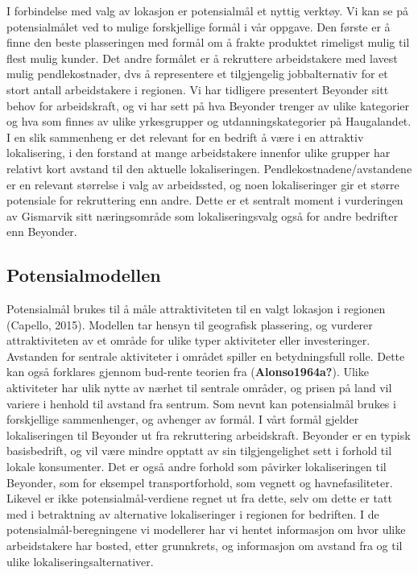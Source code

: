 \documentclass[
]{article}
\begin{document}
I forbindelse med valg av lokasjon er potensialmål et nyttig verktøy. Vi
kan se på potensialmålet ved to mulige forskjellige formål i vår
oppgave. Den første er å finne den beste plasseringen med formål om å
frakte produktet rimeligst mulig til flest mulig kunder. Det andre
formålet er å rekruttere arbeidstakere med lavest mulig pendlekostnader,
dvs å representere et tilgjengelig jobbalternativ for et stort antall
arbeidstakere i regionen. Vi har tidligere presentert Beyonder sitt
behov for arbeidskraft, og vi har sett på hva Beyonder trenger av ulike
kategorier og hva som finnes av ulike yrkesgrupper og
utdanningskategorier på Haugalandet. I en slik sammenheng er det
relevant for en bedrift å være i en attraktiv lokalisering, i den
forstand at mange arbeidstakere innenfor ulike grupper har relativt kort
avstand til den aktuelle lokaliseringen. Pendlekostnadene/avstandene er
en relevant størrelse i valg av arbeidssted, og noen lokaliseringer gir
et større potensiale for rekruttering enn andre. Dette er et sentralt
moment i vurderingen av Gismarvik sitt næringsområde som
lokaliseringsvalg også for andre bedrifter enn Beyonder.

\hypertarget{potensialmodellen}{%
\subsection{Potensialmodellen}\label{potensialmodellen}}

Potensialmål brukes til å måle attraktiviteten til en valgt lokasjon i
regionen (Capello, 2015). Modellen tar hensyn til geografisk plassering,
og vurderer attraktiviteten av et område for ulike typer aktiviteter
eller investeringer. Avstanden for sentrale aktiviteter i området
spiller en betydningsfull rolle. Dette kan også forklares gjennom
bud-rente teorien fra (\textbf{Alonso1964a?}). Ulike aktiviteter har
ulik nytte av nærhet til sentrale områder, og prisen på land vil variere
i henhold til avstand fra sentrum. Som nevnt kan potensialmål brukes i
forskjellige sammenhenger, og avhenger av formål. I vårt formål gjelder
lokaliseringen til Beyonder ut fra rekruttering arbeidskraft. Beyonder
er en typisk basisbedrift, og vil være mindre opptatt av sin
tilgjengelighet sett i forhold til lokale konsumenter. Det er også andre
forhold som påvirker lokaliseringen til Beyonder, som for eksempel
transportforhold, som vegnett og havnefasiliteter. Likevel er ikke
potensialmål-verdiene regnet ut fra dette, selv om dette er tatt med i
betraktning av alternative lokaliseringer i regionen for bedriften. I de
potensialmål-beregningene vi modellerer har vi hentet informasjon om
hvor ulike arbeidstakere har bosted, etter grunnkrets, og informasjon om
avstand fra og til ulike lokaliseringsalternativer.
\end{document}
